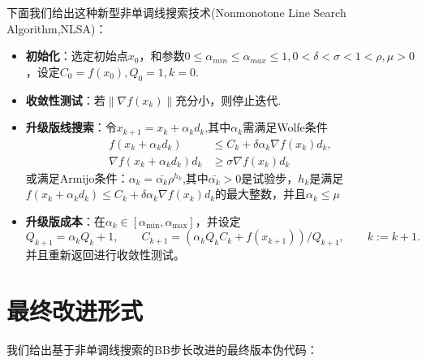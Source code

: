 下面我们给出这种新型非单调线搜索技术(Nonmonotone Line Search Algorithm,NLSA)：
\begin{itemize}
	\item \textbf{初始化}：选定初始点$ x_{0} $，和参数$ 0 \leq \alpha_{min} \leq \alpha_{max} \leq 1 , 0<  \delta < \sigma <1 < \rho , \mu >0$，设定$ C_{0} = f(x_{0}),Q_{0}=1,k=0 $.
	\item \textbf{收敛性测试}：若$ \| \nabla f(x_{k}) \| $充分小，则停止迭代.
	\item \textbf{升级版线搜索}：令$ x_{k+1}=x_{k}+\alpha_{k}d_{k} $,其中$ \alpha_{k} $需满足Wolfe条件
	\begin{eqnarray*}
		f(x_{k}+\alpha_{k}d_{k}) &\leq C_{k}+ \delta \alpha_{k} \nabla f(x_{k})d_{k},\\
		\nabla f(x_{k}+\alpha_{k}d_{k})d_{k} &\geq \sigma \nabla f(x_{k})d_{k}
	\end{eqnarray*}
	或满足Armijo条件：$ \alpha_{k} = \bar{\alpha_{k}}\rho^{h_{k}} $,其中$ \bar{\alpha_{k}} >0 $是试验步，$ h_{k} $是满足$f(x_{k}+\alpha_{k}d_{k}) \leq C_{k}+ \delta \alpha_{k} \nabla f(x_{k})d_{k} $的最大整数，并且$ \alpha_{k} \leq \mu $
	\item \textbf{升级版成本}：在$ \alpha_{k} \in \left[ \alpha_{\min} ,\alpha_{\max} \right] $，并设定
	$$ Q_{k+1}=\alpha_{k}Q_{k}+1 , \qquad C_{k+1}=(\alpha_{k} Q_{k}C_{k}+f(x_{k+1}))/Q_{k+1},\qquad k:=k+1.$$
	并且重新返回进行收敛性测试。
\end{itemize}


\section{\hei 最终改进形式}
我们给出基于非单调线搜索的BB步长改进的最终版本伪代码：

